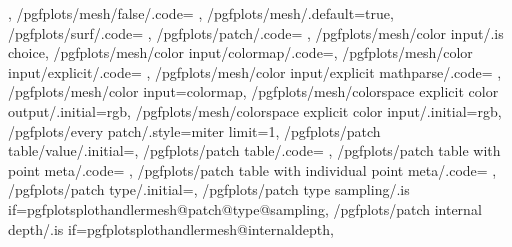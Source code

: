 {{		%
	},
	/pgfplots/mesh/false/.code={
		\def\pgfplots@meshmode{n}%
		\ifx\tikz@plot@handler\pgfplotsplothandlermesh
			\let\tikz@plot@handler=\pgfplothandlerlineto
		\fi},
	/pgfplots/mesh/.default=true,
	/pgfplots/surf/.code={%
		\def\pgfplots@meshmode{s}%
	},%
	/pgfplots/patch/.code={%
	},%
	/pgfplots/mesh/color input/.is choice,
	/pgfplots/mesh/color input/colormap/.code=\def\pgfplotsplothandlermesh@colorinput{0},%
	/pgfplots/mesh/color input/explicit/.code={%
		\def\pgfplotsplothandlermesh@colorinput{1}%
		\def\pgfplotsplothandlermesh@colorinput@mathparse{0}%
		\pgfplots@perpointmeta@expandtrue
	},%
	/pgfplots/mesh/color input/explicit mathparse/.code={%
		\def\pgfplotsplothandlermesh@colorinput@mathparse{1}%
		\pgfplots@perpointmeta@expandtrue
	},%
	/pgfplots/mesh/color input=colormap,
	/pgfplots/mesh/colorspace explicit color output/.initial=rgb,
	/pgfplots/mesh/colorspace explicit color input/.initial=rgb,
	/pgfplots/every patch/.style={miter limit=1},
	/pgfplots/patch table/value/.initial=,
	/pgfplots/patch table/.code={
		\pgfplotsplothandlermesh@patchtable@hascdatafalse
	},
	/pgfplots/patch table with point meta/.code={%
		\pgfplotsplothandlermesh@patchtable@hascdatatrue
		\pgfplotsplothandlermesh@patchtable@cdata@individualfalse
	},
	/pgfplots/patch table with individual point meta/.code={%
		\pgfplotsplothandlermesh@patchtable@hascdatatrue
		\pgfplotsplothandlermesh@patchtable@cdata@individualtrue
	},
	/pgfplots/patch type/.initial=,
	/pgfplots/patch type sampling/.is if=pgfplotsplothandlermesh@patch@type@sampling,
	/pgfplots/patch internal depth/.is if=pgfplotsplothandlermesh@internaldepth,
}
